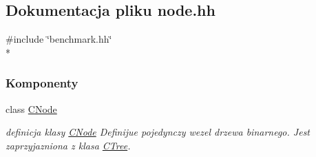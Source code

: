 \hypertarget{node_8hh}{}\subsection{Dokumentacja pliku node.\+hh}
\label{node_8hh}
{\ttfamily \#include \char`\"{}benchmark.\+hh\char`\"{}}\\*
\subsubsection*{Komponenty}
\begin{DoxyCompactItemize}
\item 
class \hyperlink{class_c_node}{C\+Node}
\begin{DoxyCompactList}\small\item\em definicja klasy \hyperlink{class_c_node}{C\+Node} Definijue pojedynczy wezel drzewa binarnego. Jest zaprzyjazniona z klasa \hyperlink{class_c_tree}{C\+Tree}. \end{DoxyCompactList}\end{DoxyCompactItemize}
